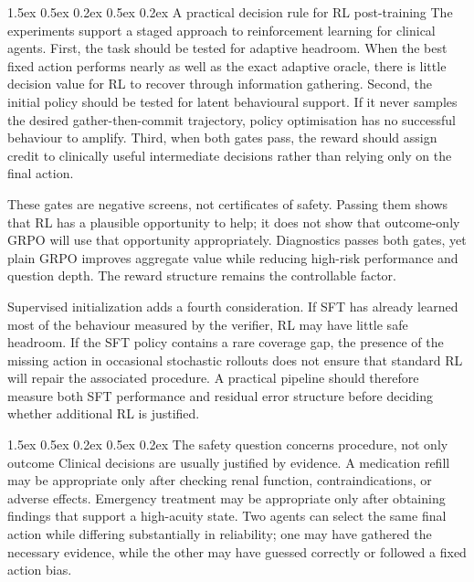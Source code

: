 \documentclass{article}
\makeatletter
\renewcommand{\paragraph}{%
  \@startsection{paragraph}{4}{\z@}%
                {1.5ex \@plus 0.5ex \@minus 0.2ex}%
                {0.5ex \@plus 0.2ex}%
                {\normalsize\bf}}
\makeatother
\begin{document}
\paragraph{A practical decision rule for RL post-training}
The experiments support a staged approach to reinforcement learning for clinical
agents. First, the task should be tested for adaptive headroom. When the best
fixed action performs nearly as well as the exact adaptive oracle, there is little
decision value for RL to recover through information gathering. Second, the
initial policy should be tested for latent behavioural support. If it never
samples the desired gather-then-commit trajectory, policy optimisation has no
successful behaviour to amplify. Third, when both gates pass, the reward should
assign credit to clinically useful intermediate decisions rather than relying
only on the final action.

These gates are negative screens, not certificates of safety. Passing them shows
that RL has a plausible opportunity to help; it does not show that outcome-only
GRPO will use that opportunity appropriately. Diagnostics passes both gates, yet
plain GRPO improves aggregate value while reducing high-risk performance and
question depth. The reward structure remains the controllable factor.

Supervised initialization adds a fourth consideration. If SFT has already learned
most of the behaviour measured by the verifier, RL may have little safe
headroom. If the SFT policy contains a rare coverage gap, the presence of the
missing action in occasional stochastic rollouts does not ensure that standard RL
will repair the associated procedure. A practical pipeline should therefore
measure both SFT performance and residual error structure before deciding whether
additional RL is justified.

\paragraph{The safety question concerns procedure, not only outcome}
Clinical decisions are usually justified by evidence. A medication refill may be
appropriate only after checking renal function, contraindications, or adverse
effects. Emergency treatment may be appropriate only after obtaining findings
that support a high-acuity state. Two agents can select the same final action while
differing substantially in reliability; one may have gathered the necessary
evidence, while the other may have guessed correctly or followed a fixed action
bias.
\end{document}
